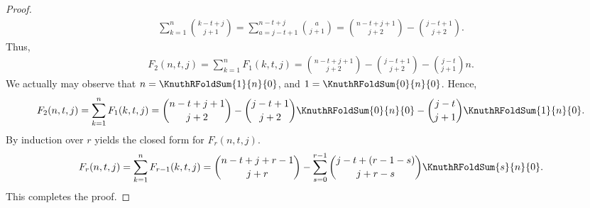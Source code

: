 \begin{proposition}
\begin{proof}
\begin{align*}
      \sum_{k=1}^{n} \binom{k-t+j}{j+1}
      =\sum_{a=j-t+1}^{n-t+j} \binom{a}{j+1}
      = \binom{n-t+j+1}{j+2} - \binom{j-t+1}{j+2}.
    \end{align*}
    Thus,
    \begin{align*}
      F_2 (n,t,j)
      = \sum_{k=1}^{n} F_1 (k,t,j)
      = \binom{n-t+j+1}{j+2} - \binom{j-t+1}{j+2} - \binom{j-t}{j+1} n.
    \end{align*}
    We actually may observe that $n=\KnuthRFoldSum{1}{n}{0}$,
    and $1=\KnuthRFoldSum{0}{n}{0}$.
    Hence,
    \begin{align*}
      F_2 (n,t,j)
      = \sum_{k=1}^{n} F_1 (k,t,j)
      = \binom{n-t+j+1}{j+2}
      - \binom{j-t+1}{j+2} \KnuthRFoldSum{0}{n}{0}
      - \binom{j-t}{j+1} \KnuthRFoldSum{1}{n}{0}.
    \end{align*}
    By induction over $r$ yields the closed form for $F_r (n,t,j)$.
    \begin{align*}
      F_{r} (n,t,j)
      = \sum_{k=1}^{n} F_{r-1} (k,t,j)
      = \binom{n-t+j+r-1}{j+r}
      -
      \sum_{s=0}^{r-1} \binom{j-t+(r-1-s)}{j+r-s}
      \KnuthRFoldSum{s}{n}{0}.
    \end{align*}
    This completes the proof.
  \end{proof}
\end{proposition}
